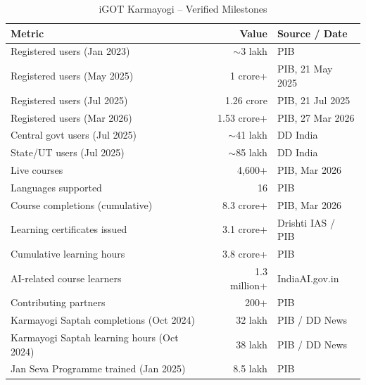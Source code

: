 \documentclass[12pt,a4paper]{article}
\begin{document}
\begin{table}[H]
\centering
\caption{iGOT Karmayogi  --  Verified Milestones}
\label{tab:igot}
\begin{tabular}{@{}p{6.5cm}rl@{}}
\toprule
\textbf{Metric} & \textbf{Value} & \textbf{Source / Date} \\
\midrule
Registered users (Jan 2023) & $\sim$3 lakh & PIB \\
Registered users (May 2025) & 1 crore+ & PIB, 21 May 2025 \\
Registered users (Jul 2025) & 1.26 crore & PIB, 21 Jul 2025 \\
Registered users (Mar 2026) & 1.53 crore+ & PIB, 27 Mar 2026 \\
Central govt users (Jul 2025) & $\sim$41 lakh & DD India \\
State/UT users (Jul 2025) & $\sim$85 lakh & DD India \\
Live courses & 4,600+ & PIB, Mar 2026 \\
Languages supported & 16 & PIB \\
Course completions (cumulative) & 8.3 crore+ & PIB, Mar 2026 \\
Learning certificates issued & 3.1 crore+ & Drishti IAS / PIB \\
Cumulative learning hours & 3.8 crore+ & PIB \\
AI-related course learners & 1.3 million+ & IndiaAI.gov.in \\
Contributing partners & 200+ & PIB \\
Karmayogi Saptah completions (Oct 2024) & 32 lakh & PIB / DD News \\
Karmayogi Saptah learning hours (Oct 2024) & 38 lakh & PIB / DD News \\
Jan Seva Programme trained (Jan 2025) & 8.5 lakh & PIB \\
\bottomrule
\end{tabular}
\end{table}
\end{document}
